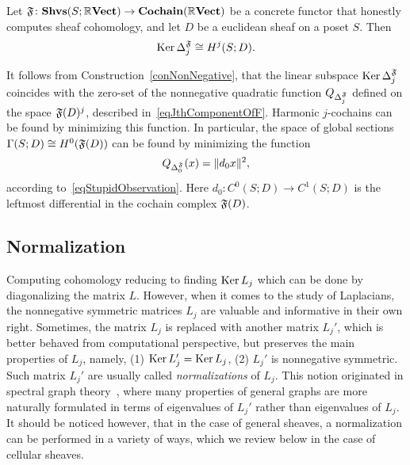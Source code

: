 \begin{prop}\label{propFuBasedLaplacianKernel}
Let $\mathfrak{F}\colon\mathbf{Shvs}(S;\mathbb{R}\mathbf{Vect})\to\mathbf{Cochain}(\mathbb{R}\mathbf{Vect})$ be a concrete functor that honestly computes sheaf cohomology, and let $D$ be a euclidean sheaf on a poset $S$. Then
\[
\operatorname{Ker}\Delta_j^{\mathfrak{F}} \cong H^j(S;D).
\]
\end{prop}

\begin{rem}\label{remFuLaplacianToOptimization}
It follows from Construction~\ref{conNonNegative}, that the linear subspace $\operatorname{Ker}\Delta_j^{\mathfrak{F}}$ coincides with the zero-set of the nonnegative quadratic function $Q_{\Delta_j^{\mathfrak{F}}}$ defined on the space $\mathfrak{F}(D)^j$, described in~\eqref{eqJthComponentOfF}. Harmonic $j$-cochains can be found by minimizing this function. In particular, the space of global sections $\Gamma(S;D)\cong H^0(\mathfrak{F}(D))$ can be found by minimizing the function
\[
Q_{\Delta_0^{\mathfrak{F}}}(x)=\|d_0x\|^2,
\]
according to~\eqref{eqStupidObservation}. Here $d_0\colon C^0(S;D)\to C^1(S;D)$ is the leftmost differential in the cochain complex $\mathfrak{F}(D)$.
\end{rem}

\subsection{Normalization}\label{subsecMathNormalize}

Computing cohomology reducing to finding $\operatorname{Ker} L_j$ which can be done by diagonalizing the matrix $L$. However, when it comes to the study of Laplacians, the nonnegative symmetric matrices $L_j$ are valuable and informative in their own right. Sometimes, the matrix $L_j$ is replaced with another matrix $L_j'$, which is better behaved from computational perspective, but preserves the main properties of $L_j$, namely, (1) $\operatorname{Ker} L_j'=\operatorname{Ker} L_j$, (2) $L_j'$ is nonnegative symmetric. Such matrix $L_j'$ are usually called \emph{normalizations} of $L_j$. This notion originated in spectral graph theory~\cite{Chung}, where many properties of general graphs are more naturally formulated in terms of eigenvalues of $L_j'$ rather than eigenvalues of $L_j$. It should be noticed however, that in the case of general sheaves, a normalization can be performed in a variety of ways, which we review below in the case of cellular sheaves.

